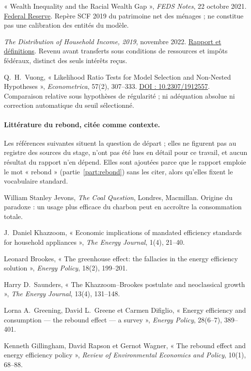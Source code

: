 \begin{description}[leftmargin=1.6em,style=nextline,itemsep=0.35em]
\item[Aladangady et Forde (2021)] « Wealth Inequality and the Racial Wealth Gap »,
  \emph{FEDS Notes}, 22 octobre 2021.
  \href{https://www.federalreserve.gov/econres/notes/feds-notes/wealth-inequality-and-the-racial-wealth-gap-20211022.html}{Federal Reserve}.
  Repère SCF 2019 du patrimoine net des ménages ; ne constitue pas une calibration des entités du modèle.
\item[CBO (2022)] \emph{The Distribution of Household Income, 2019}, novembre 2022.
  \href{https://www.cbo.gov/publication/58781}{Rapport et définitions}.
  Revenu avant transferts sous conditions de ressources et impôts fédéraux, distinct des seuls intérêts reçus.
\item[Vuong (1989)] Q.~H.~Vuong, « Likelihood Ratio Tests for Model Selection and
  Non-Nested Hypotheses », \emph{Econometrica}, 57(2), 307--333.
  \href{https://doi.org/10.2307/1912557}{DOI : 10.2307/1912557}.
  Comparaison relative sous hypothèses de régularité ; ni adéquation absolue ni correction automatique du seuil sélectionné.
\end{description}

\paragraph{Littérature du rebond, citée comme contexte.} Les références suivantes
situent la question de départ ; elles ne figurent pas au registre des sources
du stage, n'ont pas été lues en détail pour ce travail, et aucun résultat du
rapport n'en dépend. Elles sont ajoutées parce que le rapport emploie le mot
« rebond » (partie~\ref{part:rebond}) sans les citer, alors qu'elles fixent le
vocabulaire standard.
\begin{description}[leftmargin=1.6em,style=nextline,itemsep=0.25em]
\item[Jevons (1865)] William Stanley Jevons, \emph{The Coal Question}, Londres,
  Macmillan. Origine du paradoxe : un usage plus efficace du charbon peut en
  accroître la consommation totale.
\item[Khazzoom (1980)] J.~Daniel Khazzoom, « Economic implications of mandated
  efficiency standards for household appliances », \emph{The Energy Journal},
  1(4), 21--40.
\item[Brookes (1990)] Leonard Brookes, « The greenhouse effect: the fallacies in
  the energy efficiency solution », \emph{Energy Policy}, 18(2), 199--201.
\item[Saunders (1992)] Harry D.~Saunders, « The Khazzoom--Brookes postulate and
  neoclassical growth », \emph{The Energy Journal}, 13(4), 131--148.
\item[Greening, Greene et Difiglio (2000)] Lorna A.~Greening, David L.~Greene et
  Carmen Difiglio, « Energy efficiency and consumption --- the rebound effect
  --- a survey », \emph{Energy Policy}, 28(6--7), 389--401.
\item[Gillingham, Rapson et Wagner (2016)] Kenneth Gillingham, David Rapson et
  Gernot Wagner, « The rebound effect and energy efficiency policy »,
  \emph{Review of Environmental Economics and Policy}, 10(1), 68--88.
\end{description}

